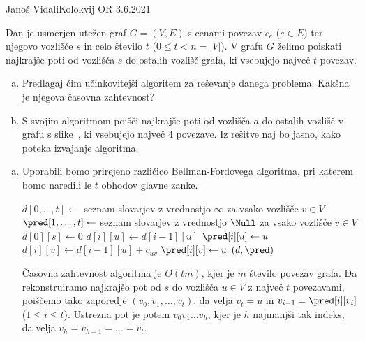 \begin{naloga}{Janoš Vidali}{Kolokvij OR 3.6.2021}
\begin{vprasanje}
Dan je usmerjen utežen graf $G = (V, E)$ s cenami povezav $c_e$ ($e \in E$)
ter njegovo vozlišče $s$ in celo število $t$ ($0 \le t < n = |V|$).
V grafu $G$ želimo poiskati najkrajše poti
od vozlišča $s$ do ostalih vozlišč grafa,
ki vsebujejo največ $t$ povezav.

\begin{enumerate}[(a)]
\item Predlagaj čim učinkovitejši algoritem za reševanje danega problema.
Kakšna je njegova časovna zahtevnost?

\item S svojim algoritmom poišči najkrajše poti
od vozlišča $a$ do ostalih vozlišč v grafu s slike~\fig,
ki vsebujejo največ $4$ povezave.
Iz rešitve naj bo jasno, kako poteka izvajanje algoritma.
\end{enumerate}
%
\begin{slika}
\makebox[\textwidth][c]{
\pgfslika
}
\end{slika}
\end{vprasanje}

\begin{odgovor}
\begin{enumerate}[(a)]
\item Uporabili bomo prirejeno različico Bellman-Fordovega algoritma,
pri katerem bomo naredili le $t$ obhodov glavne zanke.
\begin{small}
\begin{algorithmic}
    \State $d[0, \dots, t] \gets$ seznam slovarjev z vrednostjo $\infty$ za vsako vozlišče $v \in V$
    \State $\pred[1, \dots, t] \gets$ seznam slovarjev z vrednostjo $\Null$
	za vsako vozlišče $v \in V$
    \State $d[0][s] \gets 0$
            \State $d[i][u] \gets d[i-1][u]$
            \State $\pred[i][u] \gets u$
        \EndFor
                \State $d[i][v] \gets d[i-1][u] + c_{uv}$
                \State $\pred[i][v] \gets u$
            \EndIf
        \EndFor
    \EndFor
    \State \Return $(d, \pred)$
\EndFunction
\end{algorithmic}
\end{small}
Časovna zahtevnost algoritma je $O(tm)$,
kjer je $m$ število povezav grafa.
Da rekonstruiramo najkrajšo pot od $s$ do vozlišča $u \in V$
z največ $t$ povezavami,
poiščemo tako zaporedje $(v_0, v_1, \dots, v_t)$,
da velja $v_t = u$ in $v_{i-1} = \pred[i][v_i]$ ($1 \le i \le t$).
Ustrezna pot je potem $v_0 v_1 \dots v_h$,
kjer je $h$ najmanjši tak indeks, da velja $v_h = v_{h+1} = \dots = v_t$.


\end{enumerate}
\end{odgovor}
\end{naloga}

